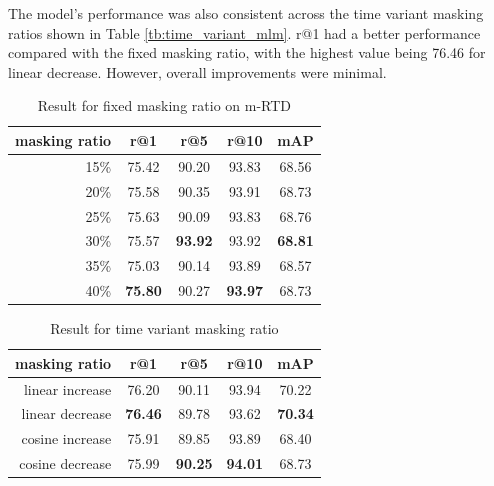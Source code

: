 The model's performance was also consistent across the time variant masking ratios shown in Table \ref{tb:time_variant_mlm}. r@1 had a better performance compared with the fixed masking ratio, with the highest value being 76.46 for linear decrease. However, overall improvements were minimal.



\begin{table}[htbp]
  \centering
  \caption{Result for fixed masking ratio on m-RTD}
  \label{tb:mrtd_fixed}
  \begin{tabular}{rcccc}
    masking ratio & r@1 & r@5 & r@10 & mAP \\ \hline
    15\% & 75.42 & 90.20 & 93.83 & 68.56 \\
    20\% & 75.58 & 90.35 & 93.91 & 68.73 \\
    25\% & 75.63 & 90.09 & 93.83 & 68.76 \\
    30\% & 75.57 & \textbf{93.92} & 93.92 & \textbf{68.81} \\
    35\% & 75.03 & 90.14 & 93.89 & 68.57 \\
    40\% & \textbf{75.80} & 90.27 & \textbf{93.97} & 68.73
  \end{tabular}
\end{table}

\begin{table}[htbp]
  \centering
  \caption{Result for time variant masking ratio}
  \label{tb:mrtd_time_variant}
  \begin{tabular}{rcccc}
    \centering
    masking ratio & r@1 & r@5 & r@10 & mAP\\ \hline
    linear increase & 76.20 & 90.11 & 93.94 & 70.22 \\
    linear decrease & \textbf{76.46} & 89.78 & 93.62 & \textbf{70.34} \\
    cosine increase & 75.91 & 89.85 & 93.89 & 68.40 \\
    cosine decrease & 75.99 & \textbf{90.25} & \textbf{94.01} & 68.73 \\
  \end{tabular}
\end{table}


